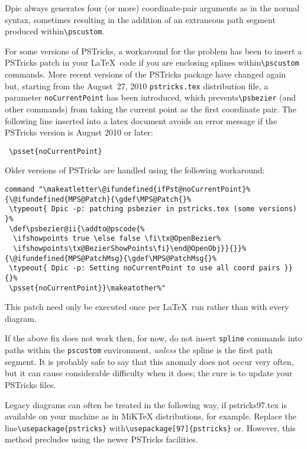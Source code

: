 \documentclass[11pt]{article}
\newcommand{\bq}{}
\newcommand{\PSTricks}{{\bq PSTricks}\xspace}
\newcommand{\tBS}{{\tt\char92}}
\begin{document}
  Dpic always generates four (or
  more) coordinate-pair arguments as in the normal syntax, sometimes
  resulting in the addition of an extraneous path segment produced
  within\verb|\pscustom|.

  For some versions of \PSTricks,
  a workaround for the problem has been to insert a
  \PSTricks patch in your \LaTeX\ code if you are enclosing splines
  within\verb|\pscustom| commands.
  More recent versions of the \PSTricks package have changed
  again but, starting from the
  August~27, 2010 {\tt pstricks.tex} distribution file, a parameter
  {\tt noCurrentPoint} has been introduced,
  which prevents\verb|\psbezier| (and other commands)
  from taking the current point as the first coordinate pair.
  The following line inserted into a latex document avoids an
  error message if the \PSTricks version is August 2010 or later:
\begin{verbatim}
 \psset{noCurrentPoint}
\end{verbatim}
  Older versions of \PSTricks are handled using the following workaround:
\begin{verbatim}
command "\makeatletter\@ifundefined{ifPst@noCurrentPoint}%
{\@ifundefined{MPS@Patch}{\gdef\MPS@Patch{}%
 \typeout{ Dpic -p: patching psbezier in pstricks.tex (some versions) }%
 \def\psbezier@ii{\addto@pscode{%
  \ifshowpoints true \else false \fi\tx@OpenBezier%
  \ifshowpoints\tx@BezierShowPoints\fi}\end@OpenObj}}{}}%
{\@ifundefined{MPS@PatchMsg}{\gdef\MPS@PatchMsg{}%
 \typeout{ Dpic -p: Setting noCurrentPoint to use all coord pairs }}{}%
 \psset{noCurrentPoint}}\makeatother%"
\end{verbatim}

  This patch need only be executed once per \LaTeX\ run rather than with
  every diagram.

  If the above fix does not work then, for now,
  do not insert {\tt spline} commands into paths within the {\tt \tBS pscustom}
  environment, {\em unless} the spline is the first path segment. It is probably
  safe to say that this anomaly does not occur very often, but it
  can cause considerable difficulty when it does; the cure is to update your
  \PSTricks files.

  Legacy diagrams can often be treated in the following way, if pstricks97.tex
  is available on your machine as in MiKTeX distributions, for example.
  Replace the line\verb|\usepackage{pstricks}|
  with\verb|\usepackage[97]{pstricks}| or\verb||.
  However, this method precludes using the newer \PSTricks facilities.
\end{document}
